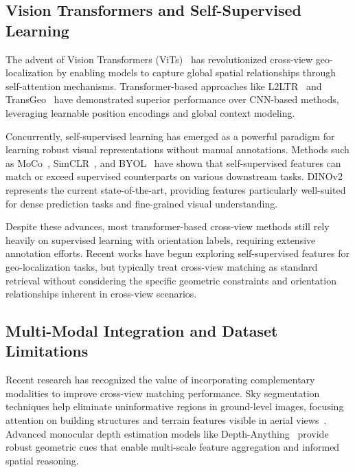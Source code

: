 \subsection{Vision Transformers and Self-Supervised Learning}

The advent of Vision Transformers (ViTs)~\cite{dosovitskiy2020image} has revolutionized cross-view geo-localization by enabling models to capture global spatial relationships through self-attention mechanisms. Transformer-based approaches like L2LTR~\cite{yang2021cross} and TransGeo~\cite{wang2021multi} have demonstrated superior performance over CNN-based methods, leveraging learnable position encodings and global context modeling.

Concurrently, self-supervised learning has emerged as a powerful paradigm for learning robust visual representations without manual annotations. Methods such as MoCo~\cite{he2020momentum}, SimCLR~\cite{chen2020simple}, and BYOL~\cite{grill2020bootstrap} have shown that self-supervised features can match or exceed supervised counterparts on various downstream tasks. DINOv2~\cite{oquab2023dinov2} represents the current state-of-the-art, providing features particularly well-suited for dense prediction tasks and fine-grained visual understanding.

Despite these advances, most transformer-based cross-view methods still rely heavily on supervised learning with orientation labels, requiring extensive annotation efforts. Recent works have begun exploring self-supervised features for geo-localization tasks, but typically treat cross-view matching as standard retrieval without considering the specific geometric constraints and orientation relationships inherent in cross-view scenarios.

\subsection{Multi-Modal Integration and Dataset Limitations}

Recent research has recognized the value of incorporating complementary modalities to improve cross-view matching performance. Sky segmentation techniques help eliminate uninformative regions in ground-level images, focusing attention on building structures and terrain features visible in aerial views~\cite{workman2015predicting}. Advanced monocular depth estimation models like Depth-Anything~\cite{yang2024depth} provide robust geometric cues that enable multi-scale feature aggregation and informed spatial reasoning.

